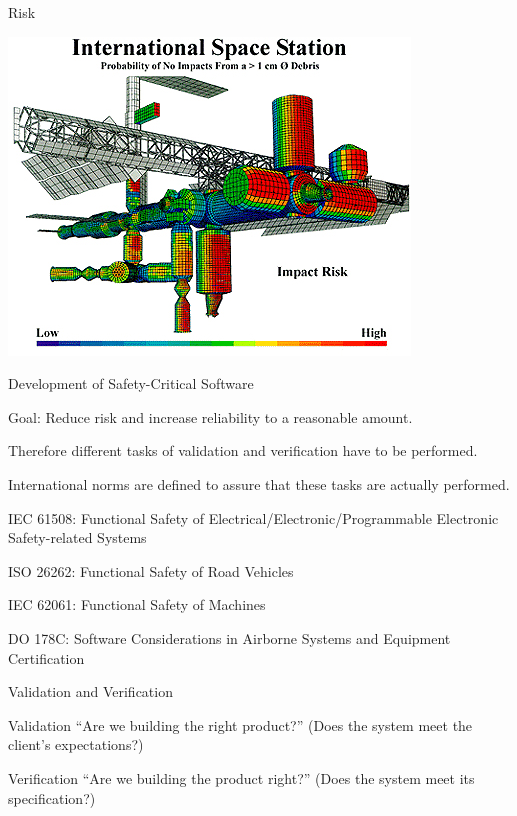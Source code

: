 \begin{frame}{Risk}

	\centering
	\includegraphics[width=0.8\linewidth]{content/images/software-quality/ISS_impact_risk}



\end{frame}

\begin{frame}{Development of Safety-Critical Software}
	
	\begin{beameritemize}
		\item Goal: Reduce risk and increase reliability to a reasonable amount.
		\item Therefore different tasks of validation and verification have to be performed.
		\item International norms are defined to assure that these tasks are actually performed.
		\begin{beameritemize}
			\item IEC 61508: Functional Safety of Electrical/Electronic/Programmable Electronic Safety-related Systems 
			\item ISO 26262: Functional Safety of Road Vehicles
			\item IEC 62061: Functional Safety of Machines
			\item DO 178C: Software Considerations in Airborne Systems and Equipment Certification
		\end{beameritemize}
	\end{beameritemize}	
	
\end{frame}

\begin{frame}{Validation and Verification}
	\begin{Block}{Validation}
		\enquote{Are we building the right product?} \newline
		(Does the system meet the client’s expectations?)
	\end{Block}
	
	\begin{Block}{Verification}
		\enquote{Are we building the product right?} \newline
		(Does the system meet its specification?)
	\end{Block}
\end{frame}

